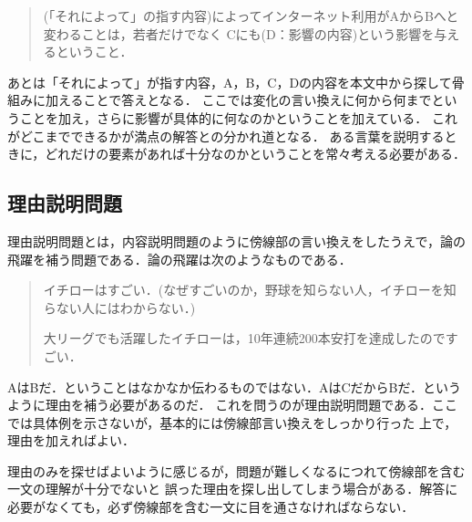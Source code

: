 \documentclass{tarticle}
\begin{document}
	\begin{quotation}
		(「それによって」の指す内容)によってインターネット利用がAからBへと変わることは，若者だけでなく
		Cにも(D：影響の内容)という影響を与えるということ．
	\end{quotation}

	あとは「それによって」が指す内容，A，B，C，Dの内容を本文中から探して骨組みに加えることで答えとなる．
	ここでは変化の言い換えに何から何までということを加え，さらに影響が具体的に何なのかということを加えている．
	これがどこまでできるかが満点の解答との分かれ道となる．
	ある言葉を説明するときに，どれだけの要素があれば十分なのかということを常々考える必要がある．

	\subsection{理由説明問題}
	理由説明問題とは，内容説明問題のように傍線部の言い換えをしたうえで，論の飛躍を補う問題である．論の飛躍は次のようなものである．

	\begin{quotation}
		イチローはすごい．(なぜすごいのか，野球を知らない人，イチローを知らない人にはわからない．)

		大リーグでも活躍したイチローは，10年連続200本安打を達成したのですごい．
	\end{quotation}

	AはBだ．ということはなかなか伝わるものではない．AはCだからBだ．というように理由を補う必要があるのだ．
	これを問うのが理由説明問題である．ここでは具体例を示さないが，基本的には傍線部言い換えをしっかり行った
	上で，理由を加えればよい．

	理由のみを探せばよいように感じるが，問題が難しくなるにつれて傍線部を含む一文の理解が十分でないと
	誤った理由を探し出してしまう場合がある．解答に必要がなくても，必ず傍線部を含む一文に目を通さなければならない．


\end{document}
